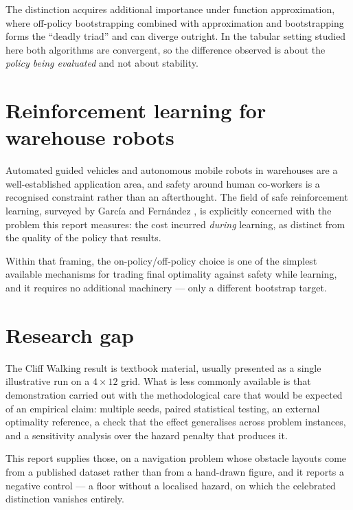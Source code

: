 The distinction acquires additional importance under function approximation, where off-policy
bootstrapping combined with approximation and bootstrapping forms the ``deadly triad''
\cite{sutton2018} and can diverge outright. In the tabular setting studied here both algorithms
are convergent, so the difference observed is about the \emph{policy being evaluated} and not
about stability.

\section{Reinforcement learning for warehouse robots}

Automated guided vehicles and autonomous mobile robots in warehouses are a well-established
application area, and safety around human co-workers is a recognised constraint rather than an
afterthought. The field of safe reinforcement learning, surveyed by Garc\'ia and Fern\'andez
\cite{garcia2015}, is explicitly concerned with the problem this report measures: the cost incurred
\emph{during} learning, as distinct from the quality of the policy that results.

Within that framing, the on-policy/off-policy choice is one of the simplest available mechanisms
for trading final optimality against safety while learning, and it requires no additional
machinery --- only a different bootstrap target.

\section{Research gap}

The Cliff Walking result is textbook material, usually presented as a single illustrative run on a
$4 \times 12$ grid. What is less commonly available is that demonstration carried out with the
methodological care that would be expected of an empirical claim: multiple seeds, paired
statistical testing, an external optimality reference, a check that the effect generalises across
problem instances, and a sensitivity analysis over the hazard penalty that produces it.

This report supplies those, on a navigation problem whose obstacle layouts come from a published
dataset rather than from a hand-drawn figure, and it reports a negative control --- a floor without
a localised hazard, on which the celebrated distinction vanishes entirely.
